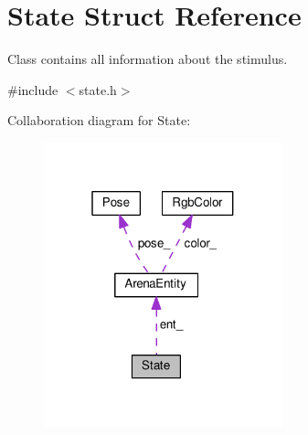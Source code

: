 \hypertarget{structState}{}\section{State Struct Reference}
\label{structState}


Class contains all information about the stimulus.  




{\ttfamily \#include $<$state.\+h$>$}



Collaboration diagram for State\+:\nopagebreak
\begin{figure}[H]
\begin{center}
\leavevmode
\includegraphics[width=196pt]{structState__coll__graph}
\end{center}
\end{figure}
